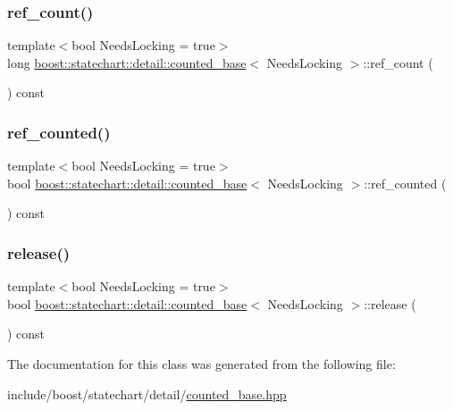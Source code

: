 \subsubsection{\texorpdfstring{ref\+\_\+count()}{ref\_count()}}
{\footnotesize\ttfamily template$<$bool Needs\+Locking = true$>$ \\
long \mbox{\hyperlink{classboost_1_1statechart_1_1detail_1_1counted__base}{boost\+::statechart\+::detail\+::counted\+\_\+base}}$<$ Needs\+Locking $>$\+::ref\+\_\+count (\begin{DoxyParamCaption}{ }\end{DoxyParamCaption}) const\hspace{0.3cm}{\ttfamily [inline]}}

\mbox{\label{classboost_1_1statechart_1_1detail_1_1counted__base_aa404549b8d8ed82d1fb8ae738a8592c6}} 
\subsubsection{\texorpdfstring{ref\+\_\+counted()}{ref\_counted()}}
{\footnotesize\ttfamily template$<$bool Needs\+Locking = true$>$ \\
bool \mbox{\hyperlink{classboost_1_1statechart_1_1detail_1_1counted__base}{boost\+::statechart\+::detail\+::counted\+\_\+base}}$<$ Needs\+Locking $>$\+::ref\+\_\+counted (\begin{DoxyParamCaption}{ }\end{DoxyParamCaption}) const\hspace{0.3cm}{\ttfamily [inline]}}

\mbox{\label{classboost_1_1statechart_1_1detail_1_1counted__base_a29f73a500a617f248e0388670985493d}} 
\subsubsection{\texorpdfstring{release()}{release()}}
{\footnotesize\ttfamily template$<$bool Needs\+Locking = true$>$ \\
bool \mbox{\hyperlink{classboost_1_1statechart_1_1detail_1_1counted__base}{boost\+::statechart\+::detail\+::counted\+\_\+base}}$<$ Needs\+Locking $>$\+::release (\begin{DoxyParamCaption}{ }\end{DoxyParamCaption}) const\hspace{0.3cm}{\ttfamily [inline]}}



The documentation for this class was generated from the following file\+:\begin{DoxyCompactItemize}
\item 
include/boost/statechart/detail/\mbox{\hyperlink{counted__base_8hpp}{counted\+\_\+base.\+hpp}}\end{DoxyCompactItemize}
